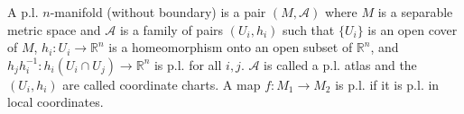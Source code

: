 A p.l. $n$-manifold (without boundary) is a pair $(M, \mathcal{A})$ where $M$ is a separable metric space and $\mathcal{A}$ is a family of pairs $(U_i, h_i)$ such that $\{U_i\}$ is an open cover of $M$, $h_i: U_i \rightarrow \mathbb{R}^n$ is a homeomorphism onto an open subset of $\mathbb{R}^n$, and $h_j h_i^{-1}: h_i(U_i \cap U_j) \rightarrow \mathbb{R}^n$ is p.l. for all $i, j$. $\mathcal{A}$ is called a p.l. atlas and the $(U_i, h_i)$ are called coordinate charts. A map $f: M_1 \rightarrow M_2$ is p.l. if it is p.l. in local coordinates.
